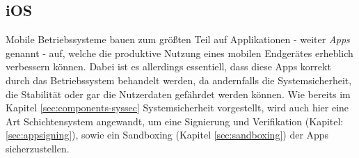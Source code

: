 \subsection{iOS}
	Mobile Betriebssysteme bauen zum größten Teil auf Applikationen - weiter
	\textsl{Apps} genannt - auf, welche die produktive Nutzung eines mobilen
	Endgerätes erheblich verbessern können. Dabei ist es allerdings
	essentiell, dass diese Apps korrekt durch das Betriebssystem behandelt werden,
	da andernfalls die Systemsicherheit, die Stabilität oder gar die Nutzerdaten
	gefährdet werden können. Wie bereits im Kapitel \ref{sec:components-syssec}
	Systemsicherheit vorgestellt, wird auch hier eine Art
	Schichtensystem angewandt, um eine Signierung und Verifikation (Kapitel:
	\ref{sec:appsigning}), sowie ein Sandboxing (Kapitel \ref{sec:sandboxing}) der
	Apps sicherzustellen.
	
